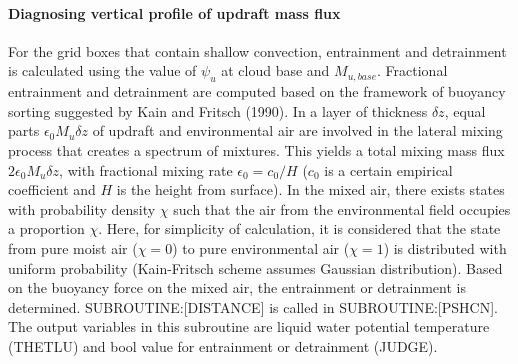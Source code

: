 \paragraph{Diagnosing vertical profile of updraft mass flux}\label{diagnosing-vertical-profile-of-updraft-mass-flux}

For the grid boxes that contain shallow convection, entrainment and detrainment is calculated using the value of $\psi_u$ at cloud base and $M_{u,base}$.
Fractional entrainment and detrainment are computed based on the framework of buoyancy sorting suggested by Kain and Fritsch (1990).
In a layer of thickness $\delta z$, equal parts $\epsilon_0 M_u \delta z$ of updraft and environmental air are involved in the lateral mixing process that creates a spectrum of mixtures.
This yields a total mixing mass flux $2\epsilon_0 M_u \delta z$, with fractional mixing rate $\epsilon_0=c_0/H$ ($c_0$ is a certain empirical coefficient and $H$ is the height from surface).
In the mixed air, there exists states with probability density $\chi$ such that the air from the environmental field occupies a proportion $\chi$. Here, for simplicity of calculation, 
it is considered that the state from pure moist air ($\chi=0$) to pure environmental air ($\chi=1$) is distributed with uniform probability (Kain-Fritsch scheme assumes Gaussian distribution).
Based on the buoyancy force on the mixed air, the entrainment or detrainment is determined. SUBROUTINE:[DISTANCE] is called in SUBROUTINE:[PSHCN].
The output variables in this subroutine are liquid water potential temperature (THETLU) and bool value for entrainment or detrainment (JUDGE).

